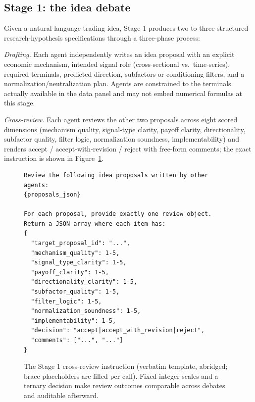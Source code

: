\documentclass{article}
\theoremstyle{definition}
\theoremstyle{plain}
\theoremstyle{remark}
\begin{document}
\subsection{Stage 1: the idea debate}

Given a natural-language trading idea, Stage 1 produces two to three structured
research-hypothesis specifications through a three-phase process:

\emph{Drafting.} Each agent independently writes an idea proposal with an explicit
economic mechanism, intended signal role (cross-sectional vs.\ time-series), required
terminals, predicted direction, subfactors or conditioning filters, and a
normalization/neutralization plan. Agents are constrained to the terminals actually
available in the data panel and may not embed numerical formulas at this stage.

\emph{Cross-review.} Each agent reviews the other two proposals across eight scored
dimensions (mechanism quality, signal-type clarity, payoff clarity, directionality,
subfactor quality, filter logic, normalization soundness, implementability) and renders
accept / accept-with-revision / reject with free-form comments; the exact instruction
is shown in Figure~\ref{fig:prompt}.

\begin{figure}[h]
\begin{center}
{\scriptsize
\begin{verbatim}
Review the following idea proposals written by other agents:
{proposals_json}

For each proposal, provide exactly one review object.
Return a JSON array where each item has:
{
  "target_proposal_id": "...",
  "mechanism_quality": 1-5,
  "signal_type_clarity": 1-5,
  "payoff_clarity": 1-5,
  "directionality_clarity": 1-5,
  "subfactor_quality": 1-5,
  "filter_logic": 1-5,
  "normalization_soundness": 1-5,
  "implementability": 1-5,
  "decision": "accept|accept_with_revision|reject",
  "comments": ["...", "..."]
}
\end{verbatim}
}
\end{center}
\caption{The Stage 1 cross-review instruction (verbatim template, abridged; brace
placeholders are filled per call). Fixed integer scales and a ternary decision make
review outcomes comparable across debates and auditable afterward.}
\label{fig:prompt}
\end{figure}
\end{document}
